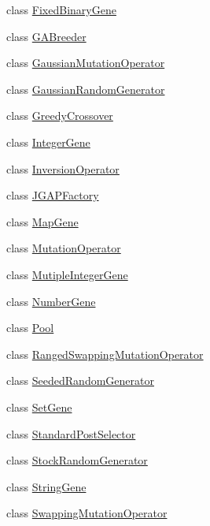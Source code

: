 \begin{DoxyCompactItemize}
\item 
class \hyperlink{classorg_1_1jgap_1_1impl_1_1_fixed_binary_gene}{Fixed\-Binary\-Gene}
\item 
class \hyperlink{classorg_1_1jgap_1_1impl_1_1_g_a_breeder}{G\-A\-Breeder}
\item 
class \hyperlink{classorg_1_1jgap_1_1impl_1_1_gaussian_mutation_operator}{Gaussian\-Mutation\-Operator}
\item 
class \hyperlink{classorg_1_1jgap_1_1impl_1_1_gaussian_random_generator}{Gaussian\-Random\-Generator}
\item 
class \hyperlink{classorg_1_1jgap_1_1impl_1_1_greedy_crossover}{Greedy\-Crossover}
\item 
class \hyperlink{classorg_1_1jgap_1_1impl_1_1_integer_gene}{Integer\-Gene}
\item 
class \hyperlink{classorg_1_1jgap_1_1impl_1_1_inversion_operator}{Inversion\-Operator}
\item 
class \hyperlink{classorg_1_1jgap_1_1impl_1_1_j_g_a_p_factory}{J\-G\-A\-P\-Factory}
\item 
class \hyperlink{classorg_1_1jgap_1_1impl_1_1_map_gene}{Map\-Gene}
\item 
class \hyperlink{classorg_1_1jgap_1_1impl_1_1_mutation_operator}{Mutation\-Operator}
\item 
class \hyperlink{classorg_1_1jgap_1_1impl_1_1_mutiple_integer_gene}{Mutiple\-Integer\-Gene}
\item 
class \hyperlink{classorg_1_1jgap_1_1impl_1_1_number_gene}{Number\-Gene}
\item 
class \hyperlink{classorg_1_1jgap_1_1impl_1_1_pool}{Pool}
\item 
class \hyperlink{classorg_1_1jgap_1_1impl_1_1_ranged_swapping_mutation_operator}{Ranged\-Swapping\-Mutation\-Operator}
\item 
class \hyperlink{classorg_1_1jgap_1_1impl_1_1_seeded_random_generator}{Seeded\-Random\-Generator}
\item 
class \hyperlink{classorg_1_1jgap_1_1impl_1_1_set_gene}{Set\-Gene}
\item 
class \hyperlink{classorg_1_1jgap_1_1impl_1_1_standard_post_selector}{Standard\-Post\-Selector}
\item 
class \hyperlink{classorg_1_1jgap_1_1impl_1_1_stock_random_generator}{Stock\-Random\-Generator}
\item 
class \hyperlink{classorg_1_1jgap_1_1impl_1_1_string_gene}{String\-Gene}
\item 
class \hyperlink{classorg_1_1jgap_1_1impl_1_1_swapping_mutation_operator}{Swapping\-Mutation\-Operator}

\end{DoxyCompactItemize}
